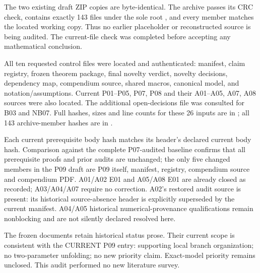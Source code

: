 \documentclass[11pt]{article}
\begin{document}
The two existing draft ZIP copies are byte-identical. The archive passes its
CRC check, contains exactly 143 files under the sole root
, and every member matches the located
 working copy. Thus no earlier
placeholder or reconstructed source is being audited. The current-file check
was completed before accepting any mathematical conclusion.

All ten requested control files were located and authenticated: manifest,
claim registry, frozen theorem package, final novelty verdict, novelty
decisions, dependency map, compendium source, shared macros, canonical model,
and notation/assumptions. Current P01--P05, P07, P08 and their A01--A05, A07,
A08 sources were also located. The additional open-decisions file was
consulted for B03 and NB07. Full hashes, sizes and line counts for these 26
inputs are in ; all 143 archive-member
hashes are in .

Each current prerequisite body hash matches its header's declared current
body hash. Comparison against the complete P07-audited baseline confirms that
all prerequisite proofs and prior audits are unchanged; the only five changed
members in the P09 draft are P09 itself, manifest, registry, compendium source
and compendium PDF. A01/A02 E01 and A05/A08 E01 are already closed as recorded;
A03/A04/A07 require no correction. A02's restored audit source is present:
its historical source-absence header is explicitly superseded by the current
manifest. A04/A05 historical numerical-provenance qualifications remain
nonblocking and are not silently declared resolved here.

The frozen documents retain historical status prose. Their current scope is
consistent with the CURRENT P09 entry: supporting local branch organization;
no two-parameter unfolding; no new priority claim. Exact-model priority
remains unclosed. This audit performed no new literature survey.
\end{document}
